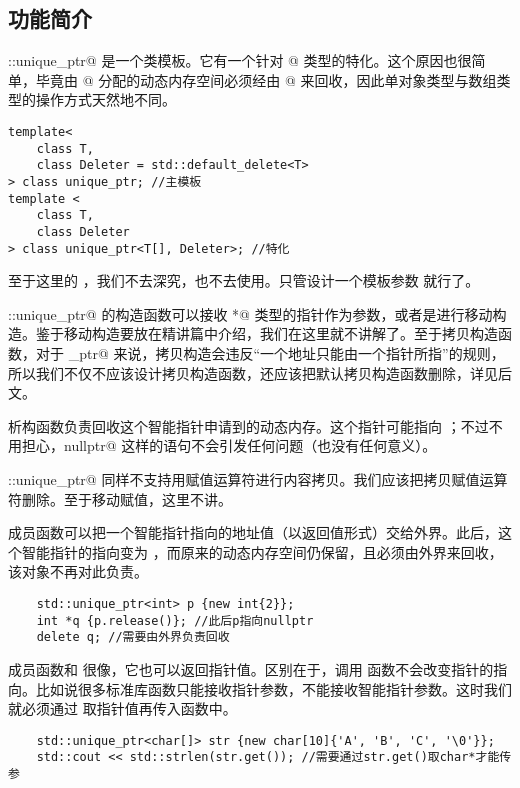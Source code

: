 \subsection*{功能简介}
\lstinline@std::unique_ptr@ 是一个类模板。它有一个针对 \lstinline@T[]@ 类型的特化。这个原因也很简单，毕竟由 \lstinline@new[]@ 分配的动态内存空间必须经由 \lstinline@delete[]@ 来回收，因此单对象类型与数组类型的操作方式天然地不同。
\begin{lstlisting}
template<
    class T,
    class Deleter = std::default_delete<T>
> class unique_ptr; //主模板
template <
    class T,
    class Deleter
> class unique_ptr<T[], Deleter>; //特化
\end{lstlisting}
至于这里的 \lstinline@Deleter@，我们不去深究，也不去使用。只管设计一个模板参数 \lstinline@T@ 就行了。\par
\lstinline@std::unique_ptr@ 的构造函数可以接收 \lstinline@T*@ 类型的指针作为参数，或者是进行移动构造。鉴于移动构造要放在精讲篇中介绍，我们在这里就不讲解了。至于拷贝构造函数，对于 \lstinline@unique_ptr@ 来说，拷贝构造会违反``一个地址只能由一个指针所指''的规则，所以我们不仅不应该设计拷贝构造函数，还应该把默认拷贝构造函数删除，详见后文。\par
析构函数负责回收这个智能指针申请到的动态内存。这个指针可能指向 \lstinline@nullptr@；不过不用担心，\lstinline@delete nullptr@ 这样的语句不会引发任何问题（也没有任何意义）。\par
\lstinline@std::unique_ptr@ 同样不支持用赋值运算符进行内容拷贝。我们应该把拷贝赋值运算符删除。至于移动赋值，这里不讲。\par
\lstinline@release@ 成员函数可以把一个智能指针指向的地址值（以返回值形式）交给外界。此后，这个智能指针的指向变为 \lstinline@nullptr@，而原来的动态内存空间仍保留，且必须由外界来回收，该对象不再对此负责。
\begin{lstlisting}
    std::unique_ptr<int> p {new int{2}};
    int *q {p.release()}; //此后p指向nullptr
    delete q; //需要由外界负责回收
\end{lstlisting}\par
\lstinline@get@ 成员函数和 \lstinline@release@ 很像，它也可以返回指针值。区别在于，调用 \lstinline@get@ 函数不会改变指针的指向。比如说很多标准库函数只能接收指针参数，不能接收智能指针参数。这时我们就必须通过 \lstinline@get@ 取指针值再传入函数中。
\begin{lstlisting}
    std::unique_ptr<char[]> str {new char[10]{'A', 'B', 'C', '\0'}};
    std::cout << std::strlen(str.get()); //需要通过str.get()取char*才能传参
\end{lstlisting}\par
